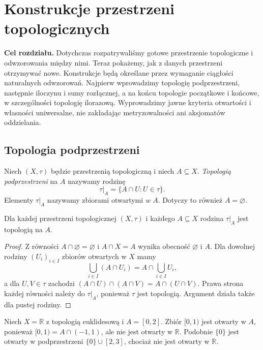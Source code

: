 \chapter{Konstrukcje przestrzeni topologicznych}
\label{ch:topog-konstrukcje}

\providecommand{\atlasref}[2]{#2}


\noindent\textbf{Cel rozdziału.}
Dotychczas rozpatrywaliśmy gotowe przestrzenie topologiczne i odwzorowania
między nimi. Teraz pokażemy, jak z danych przestrzeni otrzymywać nowe.
Konstrukcje będą określane przez wymaganie ciągłości naturalnych odwzorowań.
Najpierw wprowadzimy topologię podprzestrzeni, następnie iloczynu i sumy
rozłącznej, a na końcu topologie początkowe i końcowe, w szczególności
topologię ilorazową. Wyprowadzimy jawne kryteria otwartości i własności
uniwersalne, nie zakładając metryzowalności ani aksjomatów oddzielania.

\section{Topologia podprzestrzeni}
\label{sec:topog-podprzestrzen}

\begin{definicja}
\label{def:topog-podprzestrzen}
Niech $(X,\tau)$ będzie przestrzenią topologiczną i niech $A\subseteq X$.
\emph{Topologią podprzestrzeni} na $A$ nazywamy rodzinę
\[
\tau|_A=\{A\cap U:U\in\tau\}.
\]
Elementy $\tau|_A$ nazywamy zbiorami otwartymi \emph{w $A$}.
Dotyczy to również $A=\varnothing$.
\end{definicja}

\begin{stwierdzenie}
\label{prop:topog-podprzestrzen-topologia}
Dla każdej przestrzeni topologicznej $(X,\tau)$ i każdego $A\subseteq X$
rodzina $\tau|_A$ jest topologią na $A$.
\end{stwierdzenie}
\begin{proof}
Z równości $A\cap\varnothing=\varnothing$ i $A\cap X=A$
wynika obecność $\varnothing$ i $A$. Dla dowolnej rodziny $(U_i)_{i\in I}$
zbiorów otwartych w $X$ mamy
\[
\bigcup_{i\in I}(A\cap U_i)=A\cap\bigcup_{i\in I}U_i,
\]
a dla $U,V\in\tau$ zachodzi
$(A\cap U)\cap(A\cap V)=A\cap(U\cap V)$.
Prawa strona każdej równości należy do $\tau|_A$, ponieważ $\tau$
jest topologią. Argument działa także dla pustej rodziny.
\end{proof}

\begin{przyklad}
\label{ex:topog-otwarty-wzglednie}
Niech $X=\mathbb R$ z topologią euklidesową i $A=[0,2]$.
Zbiór $[0,1)$ jest otwarty w $A$, ponieważ
$[0,1)=A\cap(-1,1)$, ale nie jest otwarty w $\mathbb R$.
Podobnie $\{0\}$ jest otwarty w podprzestrzeni
$\{0\}\cup[2,3]$, chociaż nie jest otwarty w $\mathbb R$.
\end{przyklad}

